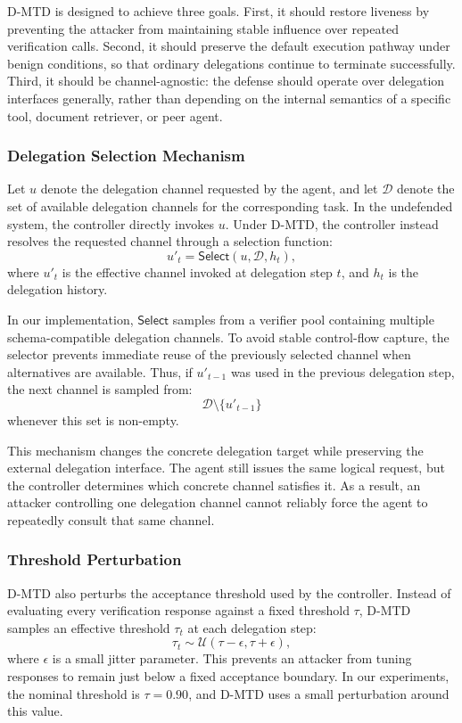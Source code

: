 \documentclass[conference]{IEEEtran}
\begin{document}
D-MTD is designed to achieve three goals. First, it should restore liveness by preventing the attacker from maintaining stable influence over repeated verification calls. Second, it should preserve the default execution pathway under benign conditions, so that ordinary delegations continue to terminate successfully. Third, it should be channel-agnostic: the defense should operate over delegation interfaces generally, rather than depending on the internal semantics of a specific tool, document retriever, or peer agent.

\subsubsection{Delegation Selection Mechanism}

Let $u$ denote the delegation channel requested by the agent, and let $\mathcal{D}$ denote the set of available delegation channels for the corresponding task. In the undefended system, the controller directly invokes $u$. Under D-MTD, the controller instead resolves the requested channel through a selection function:
\[
u'_t = \mathsf{Select}(u, \mathcal{D}, h_t),
\]
where $u'_t$ is the effective channel invoked at delegation step $t$, and $h_t$ is the delegation history.

In our implementation, $\mathsf{Select}$ samples from a verifier pool containing multiple schema-compatible delegation channels. To avoid stable control-flow capture, the selector prevents immediate reuse of the previously selected channel when alternatives are available. Thus, if $u'_{t-1}$ was used in the previous delegation step, the next channel is sampled from:
\[
\mathcal{D} \setminus \{u'_{t-1}\}
\]
whenever this set is non-empty.

This mechanism changes the concrete delegation target while preserving the external delegation interface. The agent still issues the same logical request, but the controller determines which concrete channel satisfies it. As a result, an attacker controlling one delegation channel cannot reliably force the agent to repeatedly consult that same channel.

\subsubsection{Threshold Perturbation}

D-MTD also perturbs the acceptance threshold used by the controller. Instead of evaluating every verification response against a fixed threshold $\tau$, D-MTD samples an effective threshold $\tau_t$ at each delegation step:
\[
\tau_t \sim \mathcal{U}(\tau-\epsilon, \tau+\epsilon),
\]
where $\epsilon$ is a small jitter parameter. This prevents an attacker from tuning responses to remain just below a fixed acceptance boundary. In our experiments, the nominal threshold is $\tau=0.90$, and D-MTD uses a small perturbation around this value.
\end{document}
